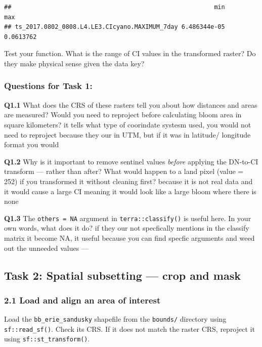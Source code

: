 \documentclass[
]{article}
\begin{document}
\begin{verbatim}
##                                                        min       max
## ts_2017.0802_0808.L4.LE3.CIcyano.MAXIMUM_7day 6.486344e-05 0.0613762
\end{verbatim}

Test your function. What is the range of CI values in the transformed
raster? Do they make physical sense given the data key?

\hypertarget{questions-for-task-1}{%
\subsubsection{Questions for Task 1:}\label{questions-for-task-1}}

\textbf{Q1.1} What does the CRS of these rasters tell you about how
distances and areas are measured? Would you need to reproject before
calculating bloom area in square kilometers? it tells what type of
coorindate systesm used, you would not need to reproject because they
our in UTM, but if it was in latitude/ longitude format you would

\textbf{Q1.2} Why is it important to remove sentinel values
\emph{before} applying the DN-to-CI transform --- rather than after?
What would happen to a land pixel (value = 252) if you transformed it
without cleaning first? because it is not real data and it would cause a
large CI meaning it would look like a large bloom where there is none

\textbf{Q1.3} The \texttt{others\ =\ NA} argument in
\texttt{terra::classify()} is useful here. In your own words, what does
it do? if they our not specfically mentions in the classify matrix it
become NA, it useful because you can find specfic arguments and weed out
the unneeded values ---

\hypertarget{task-2-spatial-subsetting-crop-and-mask}{%
\subsection{Task 2: Spatial subsetting --- crop and
mask}\label{task-2-spatial-subsetting-crop-and-mask}}

\hypertarget{load-and-align-an-area-of-interest}{%
\subsubsection{2.1 Load and align an area of
interest}\label{load-and-align-an-area-of-interest}}

Load the \texttt{bb\_erie\_sandusky} shapefile from the \texttt{bounds/}
directory using \texttt{sf::read\_sf()}. Check its CRS. If it does not
match the raster CRS, reproject it using \texttt{sf::st\_transform()}.
\end{document}
